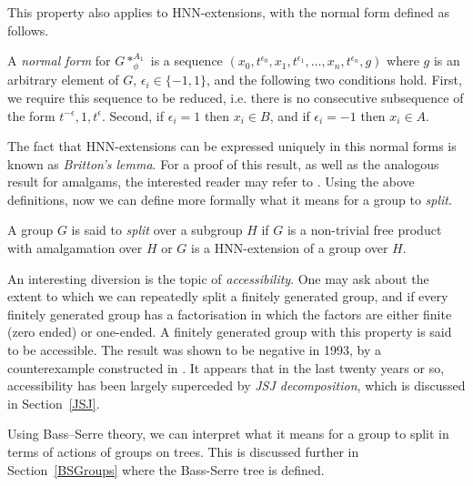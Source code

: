 This property also applies to HNN-extensions, with the normal form defined as follows.

\begin{definition}
\label{normalformhnn}
    A \emph{normal form} for \(G \ast_\phi^{A_1}\) is a sequence \((x_0, t^{\epsilon_0}, x_1, t^{\epsilon_1}, \dots, x_n, t^{\epsilon_n}, g)\) where \(g\) is an arbitrary element of \(G\), \(\epsilon_i \in \{-1, 1\}\), and the following two conditions hold. First, we require this sequence to be reduced, i.e. there is no consecutive subsequence of the form \(t^{-\epsilon}, 1, t^{\epsilon}\). Second, if \(\epsilon_i =1\) then \(x_i \in B\), and if \(\epsilon_i = -1\) then \(x_i \in A\).
\end{definition}

The fact that HNN-extensions can be expressed uniquely in this normal forms is known as \emph{Britton's lemma}. For a proof of this result, as well as the analogous result for amalgams, the interested reader may refer to \cite[p.7--8]{K10}. Using the above definitions, now we can define more formally what it means for a group to \emph{split}.

\begin{definition}
    A group \(G\) is said to \emph{split} over a subgroup \(H\) if \(G\) is a non-trivial free product with amalgamation over \(H\) or \(G\) is a HNN-extension of a group over \(H\). 
\end{definition}

\begin{aside}
    An interesting diversion is the topic of \emph{accessibility}. One may ask about the extent to which we can repeatedly split a finitely generated group, and if every finitely generated group has a factorisation in which the factors are either finite (zero ended) or one-ended. A finitely generated group with this property is said to be accessible. The result was shown to be negative in 1993, by a counterexample constructed in \cite{D93}. It appears that in the last twenty years or so, accessibility has been largely superceded by \emph{JSJ decomposition}, which is discussed in Section~\ref{JSJ}. 
\end{aside}

Using Bass--Serre theory, we can interpret what it means for a group to split in terms of actions of groups on trees. This is discussed further in Section~\ref{BSGroups} where the Bass-Serre tree is defined.

